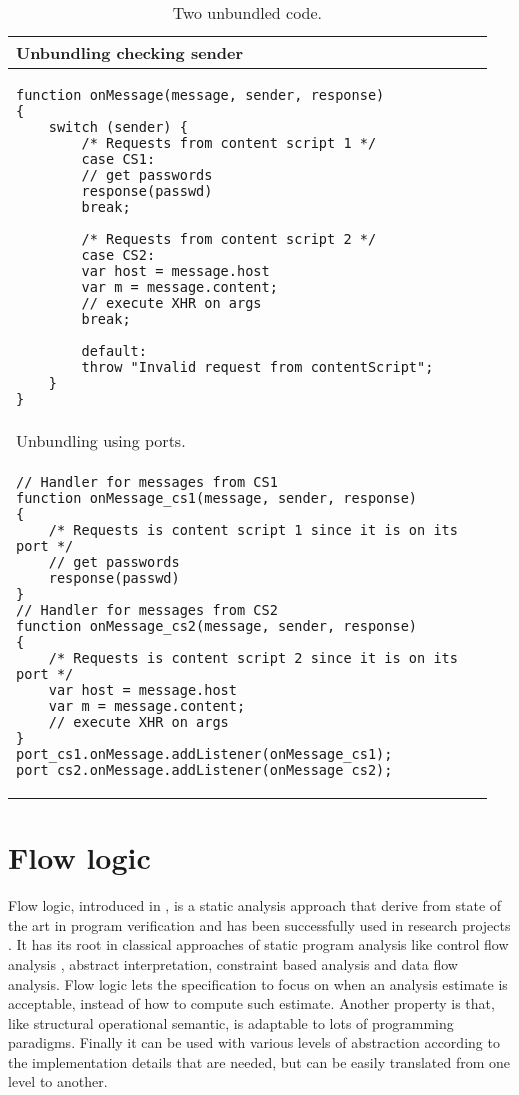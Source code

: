 \begin{table}[tlb]
\begin{small}
\begin{center}
\begin{tabular}{p{0.95\linewidth}}
Unbundling checking sender\\
\hline
\begin{lstlisting}
function onMessage(message, sender, response)
{    	
	switch (sender) {
		/* Requests from content script 1 */
		case CS1:
		// get passwords
		response(passwd)
		break;
		
		/* Requests from content script 2 */
		case CS2:
		var host = message.host
		var m = message.content;
		// execute XHR on args
		break;
				
		default:
		throw "Invalid request from contentScript";
	}
}
\end{lstlisting}\\
\hline
\hline
Unbundling using ports.\\
\hline
\begin{lstlisting}
// Handler for messages from CS1
function onMessage_cs1(message, sender, response)
{    	
	/* Requests is content script 1 since it is on its port */
	// get passwords
	response(passwd)
}
// Handler for messages from CS2
function onMessage_cs2(message, sender, response)
{    	
	/* Requests is content script 2 since it is on its port */
	var host = message.host
	var m = message.content;
	// execute XHR on args
}
port_cs1.onMessage.addListener(onMessage_cs1);
port_cs2.onMessage.addListener(onMessage_cs2);
\end{lstlisting}\\
\hline
\end{tabular}
\end{center}
\end{small}
\caption{Two unbundled code.}
\label{tab:UnBundled}
\end{table}

\section{Flow logic}
\label{sec:FlowLogic}
Flow logic, introduced in \cite{FlowLogic}, is a static analysis approach that derive from state of the art in program verification and has been successfully used in research projects \cite{CarmelFlowLogic,CarmelFlowLogicFormalization}. It has its root in classical approaches of static program analysis \cite{PrincipleProgramAnalysis} like control flow analysis \cite{CMLCFA}, abstract interpretation, constraint based analysis and data flow analysis. Flow logic lets the specification to focus on when an analysis estimate is acceptable, instead of how to compute such estimate. Another property is that, like structural operational semantic, is adaptable to lots of programming paradigms. Finally it can be used with various levels of abstraction according to the implementation details that are needed, but can be easily translated from one level to another. 

